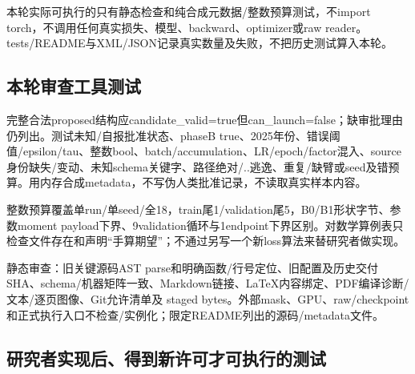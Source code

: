 \documentclass[UTF8,fontset=fandol,10pt]{ctexart}
\begin{document}
本轮实际可执行的只有静态检查和纯合成元数据/\allowbreak{}整数预算测试，不import torch，不调用任何真实损失、模型、backward、optimizer或raw reader。tests/\allowbreak{}README与XML/\allowbreak{}JSON记录真实数量及失败，不把历史测试算入本轮。

\subsection{本轮审查工具测试}

完整合法proposed结构应candidate\_\allowbreak{}valid=true但can\_\allowbreak{}launch=false；缺审批理由仍列出。测试未知/\allowbreak{}自报批准状态、phaseB true、2025年份、错误阈值/\allowbreak{}epsilon/\allowbreak{}tau、整数bool、batch/\allowbreak{}accumulation、LR/\allowbreak{}epoch/\allowbreak{}factor混入、source身份缺失/\allowbreak{}变动、未知schema关键字、路径绝对/\allowbreak{}..逃逸、重复/\allowbreak{}缺臂或seed及错预算。用内存合成metadata，不写伪人类批准记录，不读取真实样本内容。

整数预算覆盖单run/\allowbreak{}单seed/\allowbreak{}全18，train尾1/\allowbreak{}validation尾5，B0/\allowbreak{}B1形状字节、参数moment payload下界、9validation循环与1endpoint下界区别。对数学算例表只检查文件存在和声明“手算期望”；不通过另写一个新loss算法来替研究者做实现。

静态审查：旧关键源码AST parse和明确函数/\allowbreak{}行号定位、旧配置及历史交付SHA、schema/\allowbreak{}机器矩阵一致、Markdown链接、LaTeX内容绑定、PDF编译诊断/\allowbreak{}文本/\allowbreak{}逐页图像、Git允许清单及 staged bytes。外部mask、GPU、raw/\allowbreak{}checkpoint和正式执行入口不检查/\allowbreak{}实例化；限定README列出的源码/\allowbreak{}metadata文件。

\subsection{研究者实现后、得到新许可才可执行的测试}
\end{document}
